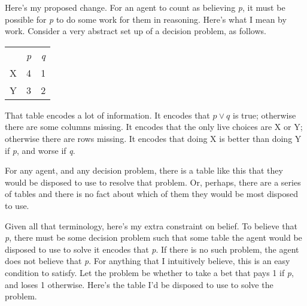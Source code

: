 Here's my proposed change. For an agent to count as believing \emph{p}, it must be possible for \emph{p} to do some work for them in reasoning. Here's what I mean by work. Consider a very abstract set up of a decision problem, as follows.

\begin{center}
\begin{tabular}{rcc}
&\emph{p}&\emph{q}\\
X&4&1\\
Y&3&2\\
\end{tabular}
\end{center}

%
%
%

That table encodes a lot of information. It encodes that $p \vee q$ is true; otherwise there are some columns missing. It encodes that the only live choices are X or Y; otherwise there are rows missing. It encodes that doing X is better than doing Y if \emph{p}, and worse if \emph{q}. 

For any agent, and any decision problem, there is a table like this that they would be disposed to use to resolve that problem. Or, perhaps, there are a series of tables and there is no fact about which of them they would be most disposed to use.

Given all that terminology, here's my extra constraint on belief. To believe that \emph{p}, there must be some decision problem such that some table the agent would be disposed to use to solve it encodes that \emph{p}. If there is no such problem, the agent does not believe that \emph{p}. For anything that I intuitively believe, this is an easy condition to satisfy. Let the problem be whether to take a bet that pays 1 if \emph{p}, and loses 1 otherwise. Here's the table I'd be disposed to use to solve the problem.

